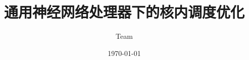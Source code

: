 \documentclass[12pt,a4paper]{article}
\title{通用神经网络处理器下的核内调度优化}
\author{Team}
\date{\today}
\begin{document}
\maketitle

\begin{abstract}
\end{abstract}









\end{document}
